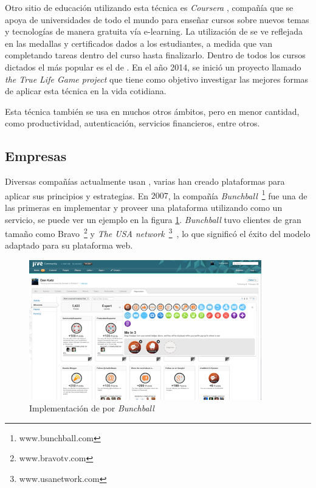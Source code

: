 Otro sitio de educación utilizando esta técnica es \emph{Coursera} \cite{Coursera},
compañía que se apoya de universidades de todo el mundo para enseñar
cursos sobre nuevos temas y tecnologías de manera gratuita vía e-learning.
La utilización de {\gam} se ve reflejada en las medallas y certificados dados
a los estudiantes, a medida que van completando tareas dentro del curso
hasta finalizarlo.
Dentro de todos los cursos dictados el más popular es el de {\gam}\cite{Gam:Util:5}.
En el año 2014, se inició un proyecto llamado \emph{the True Life Game project}
que tiene como objetivo investigar las mejores formas de aplicar esta técnica en
la vida cotidiana.

Esta técnica también se usa en muchos otros ámbitos, pero en menor cantidad,
como productividad, autenticación, servicios financieros, entre otros.

\subsection{Empresas}

Diversas compañías actualmente usan {\gam}, varias han creado plataformas para
aplicar sus principios y estrategias.
En $2007$, la compañía \emph{Bunchball}~\footnote{www.bunchball.com} fue una de
las primeras en implementar y proveer una plataforma utilizando {\gam} como un
servicio\cite{Gam:Bunchball:1}, se puede ver un ejemplo en la figura \ref{fig:bunch}.
\emph{Bunchball} tuvo clientes de gran tamaño como Bravo~\footnote{www.bravotv.com}
y \emph{The USA network}~\footnote{www.usanetwork.com}~\cite{Gam:Bunchball:2},
lo que significó el éxito del modelo adaptado para su plataforma web.

\begin{figure}[!htb]
  \centering
  \includegraphics[width=0.9\textwidth]{images/Gam_bunch.png}
  \caption[Implementación \emph{Bunchball}]{Implementación de {\gam} por \emph{Bunchball}}
  \label{fig:bunch}
\end{figure}



